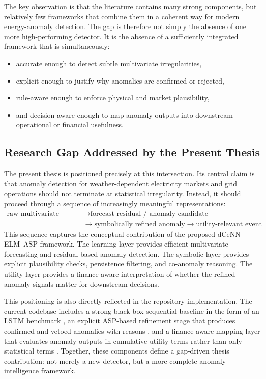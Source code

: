 The key observation is that the literature contains many strong components, but relatively few frameworks that combine them in a coherent way for modern energy-anomaly detection. The gap is therefore not simply the absence of one more high-performing detector. It is the absence of a sufficiently integrated framework that is simultaneously:
\begin{itemize}
	\item accurate enough to detect subtle multivariate irregularities,
	\item explicit enough to justify why anomalies are confirmed or rejected,
	\item rule-aware enough to enforce physical and market plausibility,
	\item and decision-aware enough to map anomaly outputs into downstream operational or financial usefulness.
\end{itemize}

\subsection{Research Gap Addressed by the Present Thesis}

The present thesis is positioned precisely at this intersection. Its central claim is that anomaly detection for weather-dependent electricity markets and grid operations should not terminate at statistical irregularity. Instead, it should proceed through a sequence of increasingly meaningful representations:
\begin{equation}
	\begin{aligned}
		\text{raw multivariate signal}
		&\rightarrow \text{forecast residual / anomaly candidate} \\
		&\rightarrow \text{symbolically refined anomaly}
		\rightarrow \text{utility-relevant event}
	\end{aligned}
	\label{eq:gap_pipeline}
\end{equation}
This sequence captures the conceptual contribution of the proposed dCeNN--ELM--ASP framework. The learning layer provides efficient multivariate forecasting and residual-based anomaly detection. The symbolic layer provides explicit plausibility checks, persistence filtering, and co-anomaly reasoning. The utility layer provides a finance-aware interpretation of whether the refined anomaly signals matter for downstream decisions.

This positioning is also directly reflected in the repository implementation. The current codebase includes a strong black-box sequential baseline in the form of an LSTM benchmark \cite{repo_thesis_grid_anomaly}, an explicit ASP-based refinement stage that produces confirmed and vetoed anomalies with reasons \cite{repo_thesis_grid_anomaly}, and a finance-aware mapping layer that evaluates anomaly outputs in cumulative utility terms rather than only statistical terms \cite{repo_thesis_grid_anomaly}. Together, these components define a gap-driven thesis contribution: not merely a new detector, but a more complete anomaly-intelligence framework.


